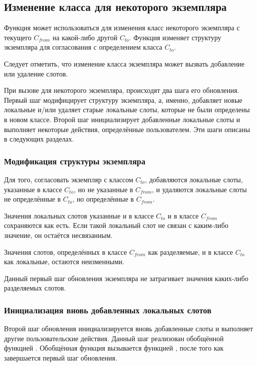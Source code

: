 \subsection{Изменение класса для некоторого экземпляра}
\label{Changing-the-Class-of-an-Instance-SECTION}

Функция  может использоваться для изменения класс некоторого
экземпляра с текущего $C_{from}$ на какой-либо другой $C_{to}$. Функция изменяет
структуру экземпляра для согласования с определением класса $C_{to}$.

Следует отметить, что изменение класса экземпляра может вызвать добавление или
удаление слотов.

При вызове  для некоторого экземпляра, происходят два шага
его обновления. Первый шаг модифицирует структуру экземпляра, а, именно,
добавляет новые локальные и/или удаляет старые локальные слоты, которые не были
определены в новом классе. Второй шаг инициализирует добавленные локальные слоты
и выполняет некоторые действия, определённые пользователем. Эти шаги описаны в
следующих разделах.

\subsubsection{Модификация структуры экземпляра}

Для того, согласовать экземпляр с классом $C_{to}$, добавляются локальные слоты,
указанные в классе $C_{to}$, но не указанные в $C_{from}$, и удаляются локальные
слоты не определённые в $C_{to}$, но определённые в $C_{from}$.

Значения локальных слотов указанные и в классе $C_{to}$ и в классе $C_{from}$
сохраняются как есть. Если такой локальный слот не связан с каким-либо значение,
он остаётся несвязанным.

Значения слотов, определённых в классе $C_{from}$ как разделяемые, и в классе
$C_{to}$ как локальные, остаются неизменными.

Данный первый шаг обновления экземпляра не затрагивает значения каких-либо
разделяемых слотов.

\subsubsection{Инициализация вновь добавленных локальных слотов}

Второй шаг обновления инициализируется вновь добавленные слоты и выполняет
другие пользовательские действия. Данный шаг реализован обобщённой функцией 
. Обобщённая функция
 вызывается функцией
, после того как завершается первый шаг обновления.

